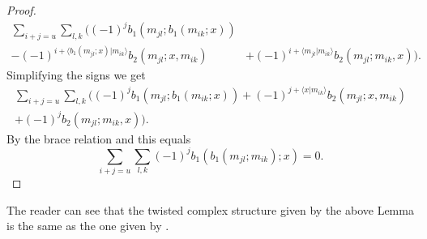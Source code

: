 \documentclass[Thesis.tex]{subfiles}
\begin{document}
\begin{proof}
\begin{align}
\sum_{i+j=u}\sum_{l,k}((-1)^jb_1(m_{jl}; b_1(m_{ik};x))&\\
 -(-1)^{i+\langle b_1(m_{jl};x)|m_{ik}\rangle}b_2(m_{jl};x,m_{ik})&+(-1)^{i+\langle m_{jl}| m_{ik}\rangle}b_2(m_{jl};m_{ik},x)).\nonumber
\end{align}
Simplifying the signs we get
\begin{gather*}
\sum_{i+j=u}\sum_{l,k}((-1)^jb_1(m_{jl}; b_1(m_{ik};x))+(-1)^{j+\langle x|m_{ik}\rangle}b_2(m_{jl};x,m_{ik})\\+(-1)^{j}b_2(m_{jl};m_{ik},x)).
\end{gather*}
By the brace relation and  this equals
\[\sum_{i+j=u}\sum_{l,k}(-1)^jb_1(b_1(m_{jl};m_{ik});x)=0.\]
\end{proof}

The reader can see that the twisted complex structure given by the above Lemma is the same as the one given by .

\end{document}
